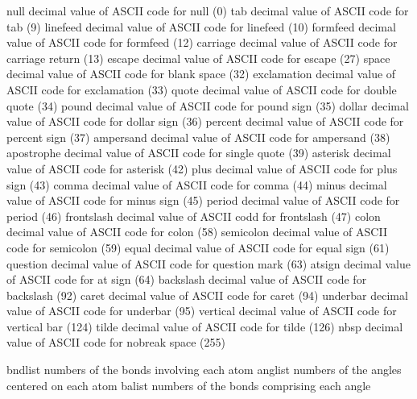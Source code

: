 \documentclass[letterpaper,11pt,english]{sphinxmanual}
\begin{document}
\begin{sphinxVerbatim}[commandchars=\\\{\}]
null            decimal value of ASCII code for null (0)
tab             decimal value of ASCII code for tab (9)
linefeed        decimal value of ASCII code for linefeed (10)
formfeed        decimal value of ASCII code for formfeed (12)
carriage        decimal value of ASCII code for carriage return (13)
escape          decimal value of ASCII code for escape (27)
space           decimal value of ASCII code for blank space (32)
exclamation     decimal value of ASCII code for exclamation (33)
quote           decimal value of ASCII code for double quote (34)
pound           decimal value of ASCII code for pound sign (35)
dollar          decimal value of ASCII code for dollar sign (36)
percent         decimal value of ASCII code for percent sign (37)
ampersand       decimal value of ASCII code for ampersand (38)
apostrophe      decimal value of ASCII code for single quote (39)
asterisk        decimal value of ASCII code for asterisk (42)
plus            decimal value of ASCII code for plus sign (43)
comma           decimal value of ASCII code for comma (44)
minus           decimal value of ASCII code for minus sign (45)
period          decimal value of ASCII code for period (46)
frontslash      decimal value of ASCII codd for frontslash (47)
colon           decimal value of ASCII code for colon (58)
semicolon       decimal value of ASCII code for semicolon (59)
equal           decimal value of ASCII code for equal sign (61)
question        decimal value of ASCII code for question mark (63)
atsign          decimal value of ASCII code for at sign (64)
backslash       decimal value of ASCII code for backslash (92)
caret           decimal value of ASCII code for caret (94)
underbar        decimal value of ASCII code for underbar (95)
vertical        decimal value of ASCII code for vertical bar (124)
tilde           decimal value of ASCII code for tilde (126)
nbsp            decimal value of ASCII code for nobreak space (255)
\end{sphinxVerbatim}

\sphinxAtStartPar
{}

\begin{sphinxVerbatim}[commandchars=\\\{\}]
bndlist         numbers of the bonds involving each atom
anglist         numbers of the angles centered on each atom
balist          numbers of the bonds comprising each angle
\end{sphinxVerbatim}
\end{document}
